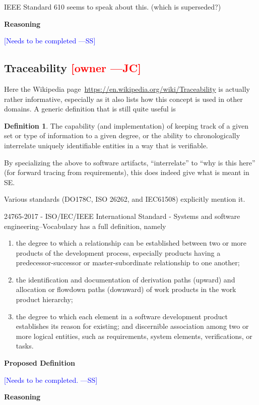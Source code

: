 \documentclass[letterpaper,cleveref]{lipics-v2019}
\newcommand{\authornote}[3]{\textcolor{#1}{[#3 ---#2]}}
\newcommand{\authornote}[3]{}
\newcommand{\wss}[1]{\authornote{blue}{SS}{#1}} %
\newcommand{\jc}[1]{\authornote{red}{JC}{#1}} %
\theoremstyle{definition}
\newtheorem{defn}{Definition}
\begin{document}
IEEE Standard 610 seems to speak about this. (which is superseded?)

\noindent \textbf{Reasoning}

\wss{Needs to be completed}

\subsection{Traceability \jc{owner}}

Here the Wikipedia page~\url{https://en.wikipedia.org/wiki/Traceability} is
actually rather informative, especially as it also lists how this concept is
used in other domains.  A generic definition that is still quite useful is
\begin{defn}
The capability (and implementation) of keeping track of a given set or type of
information to a given degree, or the ability to chronologically interrelate
uniquely identifiable entities in a way that is verifiable.
\end{defn}
By specializing the above to software artifacts, ``interrelate'' to 
``why is this here'' (for forward tracing from requirements), this does
indeed give what is meant in SE.

Various standards (DO178C, ISO 26262, and IEC61508) explicitly mention it.

24765-2017 - ISO/IEC/IEEE International Standard - Systems and software engineering--Vocabulary
has a full definition, namely
\begin{enumerate}
\item the degree to which a relationship can be established between two or more
products of the development process, especially products having a
predecessor-successor or master-subordinate relationship to one another;
\item
the identification and documentation of derivation paths (upward) and
allocation or flowdown paths (downward) of work products in the work product
hierarchy;
\item the degree to which each element in a software development
product establishes its reason for existing; and discernible association
among two or more logical entities, such as requirements, system elements,
verifications, or tasks.
\end{enumerate}

\noindent \textbf{Proposed Definition} 

\wss{Needs to be completed.}

\noindent \textbf{Reasoning}
\end{document}
